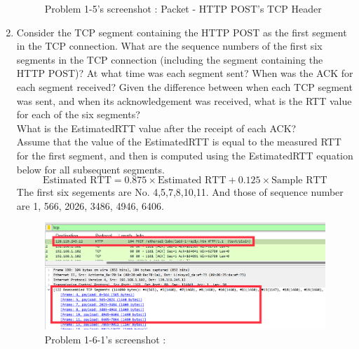 \begin{enumerate}[label=\bfseries Problem \arabic*:,leftmargin=*,labelindent=1em]
\begin{figure}[!h]
    		\caption{\footnotesize Problem 1-5's screenshot : Packet - HTTP POST’s TCP Header}
    		\vspace{-10pt}
        \end{figure}
        \item Consider the TCP segment containing the HTTP POST as the first segment in the TCP connection. What are the sequence numbers of the first six segments in the TCP connection (including the segment containing the HTTP POST)? At what time was each segment sent? When was the ACK for each segment received? Given the difference between when each TCP segment was sent, and when its acknowledgement was received, what is the RTT value for each of the six segments? \\
        What is the EstimatedRTT value after the receipt of each ACK?\\
        Assume that the value of the EstimatedRTT is equal to the measured RTT for the first segment, and then is computed using the EstimatedRTT equation below for all subsequent segments.\\
        \begin{equation*}
            \text{Estimated RTT} = 0.875 \times \text{Estimated RTT} + 0.125 \times \text{Sample RTT}
        \end{equation*}
        \soln
        The first six segements are No. 4,5,7,8,10,11. And those of sequence number are 1, 566, 2026, 3486, 4946, 6406.\\
        \vspace{-4mm}  
        \begin{figure}[!h]\centering
        \hspace{15mm}
    		\includegraphics[width=.8\textwidth]{image/week02/1-6-1.png}
    		\caption{\footnotesize Problem 1-6-1's screenshot : }
    		\vspace{-10pt}
        \end{figure}    
        

\end{enumerate}
